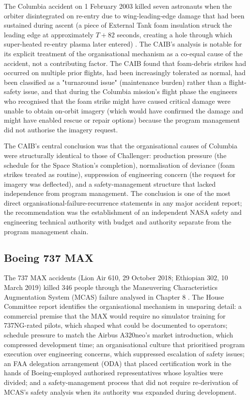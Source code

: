 The Columbia accident on 1 February 2003 killed seven astronauts when the orbiter disintegrated on re-entry due to wing-leading-edge damage that had been sustained during ascent (a piece of External Tank foam insulation struck the leading edge at approximately $T+82$ seconds, creating a hole through which super-heated re-entry plasma later entered) \cite{acc:caib-columbia}. The CAIB's analysis is notable for its explicit treatment of the organisational mechanism as a co-equal cause of the accident, not a contributing factor. The CAIB found that foam-debris strikes had occurred on multiple prior flights, had been increasingly tolerated as normal, had been classified as a "turnaround issue" (maintenance burden) rather than a flight-safety issue, and that during the Columbia mission's flight phase the engineers who recognised that the foam strike might have caused critical damage were unable to obtain on-orbit imagery (which would have confirmed the damage and might have enabled rescue or repair options) because the program management did not authorise the imagery request.

The CAIB's central conclusion was that the organisational causes of Columbia were structurally identical to those of Challenger: production pressure (the schedule for the Space Station's completion), normalisation of deviance (foam strikes treated as routine), suppression of engineering concern (the request for imagery was deflected), and a safety-management structure that lacked independence from program management. The conclusion is one of the most direct organisational-failure-recurrence statements in any major accident report; the recommendation was the establishment of an independent NASA safety and engineering technical authority with budget and authority separate from the program management chain.

\subsection*{Boeing 737 MAX}

The 737 MAX accidents (Lion Air 610, 29 October 2018; Ethiopian 302, 10 March 2019) killed 346 people through the Maneuvering Characteristics Augmentation System (MCAS) failure analysed in Chapter 8 \cite{acc:house-737max-2020}. The House Committee report identifies the organisational mechanism in unsparing detail: a commercial premise that the MAX would require no simulator training for 737NG-rated pilots, which shaped what could be documented to operators; schedule pressure to match the Airbus A320neo's market introduction, which compressed development time; an organisational culture that prioritised program execution over engineering concerns, which suppressed escalation of safety issues; an FAA delegation arrangement (ODA) that placed certification work in the hands of Boeing-employed authorised representatives whose loyalties were divided; and a safety-management process that did not require re-derivation of MCAS's safety analysis when its authority was expanded during development.

